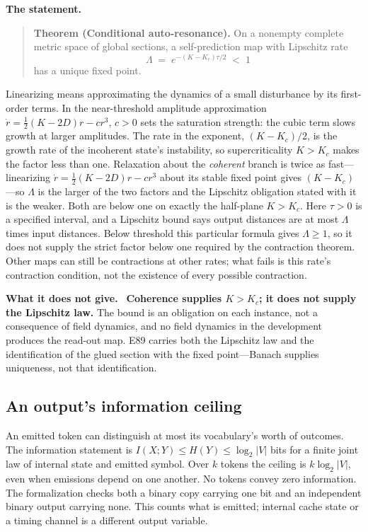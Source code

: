\documentclass[11pt]{article}
\newcommand{\statement}{\par\smallskip\noindent\textbf{The statement.}\ }
\newcommand{\scope}{\par\smallskip\noindent\textbf{What it does not give.}\ }
\newcommand{\Kc}{K_{c}}
\begin{document}
\statement

\begin{quote}
\textbf{Theorem (Conditional auto-resonance).} On a nonempty complete metric space of
global sections, a self-prediction map with Lipschitz rate
\[
 \Lambda \;=\; e^{-(K-\Kc)\tau/2} \;<\; 1
\]
has a unique fixed point.
\end{quote}

\noindent
Linearizing means approximating the dynamics of a small disturbance by its
first-order terms. In the near-threshold amplitude approximation
$\dot r=\tfrac12(K-2D)r-cr^3$, $c>0$ sets the saturation strength: the cubic
term slows growth at larger amplitudes. The rate in the exponent, $(K-\Kc)/2$,
is the growth rate of the incoherent
state's instability, so supercriticality $K>\Kc$ makes the factor less than one.
Relaxation about the \emph{coherent} branch is twice as fast---linearizing
$\dot r = \tfrac12(K-2D)r - cr^3$ about its stable fixed point gives
$(K-\Kc)$---so $\Lambda$ is the larger of the two factors and the Lipschitz
obligation stated with it is the weaker. Both are below one on exactly the
half-plane $K>\Kc$.
Here $\tau>0$ is a specified interval, and a Lipschitz bound says output
distances are at most $\Lambda$ times input distances. Below threshold this
particular formula gives $\Lambda\ge1$, so it does not supply the strict
factor below one required by the contraction theorem. Other maps can still
be contractions at other rates; what fails is this rate's contraction
condition, not the existence of every possible contraction.

\scope
\textbf{Coherence supplies $K>\Kc$; it does not supply the Lipschitz law.} The
bound is an obligation on each instance, not a consequence of field dynamics,
and no field dynamics in the development produces the read-out map. E89 carries
both the Lipschitz law and the identification of the glued section with the
fixed point---Banach supplies uniqueness, not that identification.

\subsection{An output's information ceiling}

An emitted token can distinguish at most its vocabulary's worth of outcomes.
The information statement is $I(X;Y)\leq H(Y)\leq\log_2|V|$ bits for a finite
joint law of internal state and emitted symbol. Over $k$ tokens the ceiling is
$k\log_2|V|$, even when emissions depend on one another. No tokens convey zero
information. The formalization checks both a binary copy carrying one bit and
an independent binary output carrying none. This counts what is emitted;
internal cache state or a timing channel is a different output variable.
\end{document}
